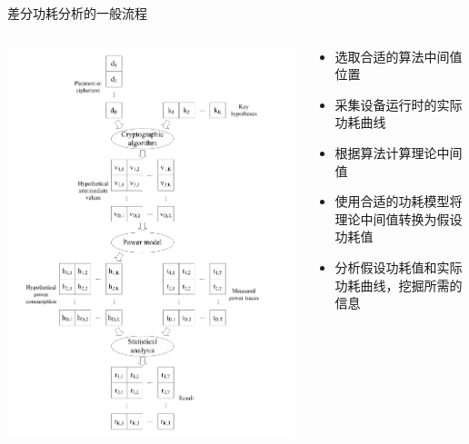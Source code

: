 \documentclass{beamer}
\begin{document}
\begin{frame}{差分功耗分析的一般流程}
\begin{columns}
    \begin{column}{0.45\textwidth}
        \includegraphics[width=\columnwidth]{./images/dpa.png}
    \end{column}
    \begin{column}{0.55\textwidth}
        \begin{itemize}
            \item 选取合适的算法中间值位置
            \item 采集设备运行时的实际功耗曲线
            \item 根据算法计算理论中间值
            \item 使用合适的功耗模型将理论中间值转换为假设功耗值
            \item 分析假设功耗值和实际功耗曲线，挖掘所需的信息
        \end{itemize}
    \end{column}
\end{columns}
\end{frame}
\end{document}
